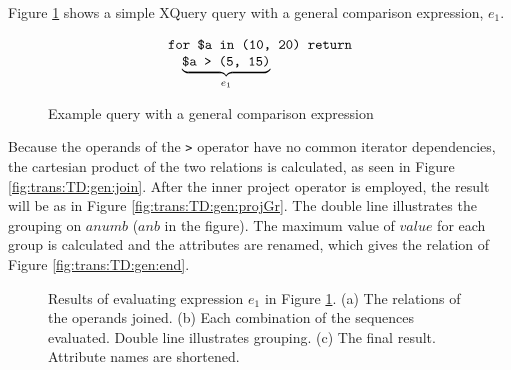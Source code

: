\begin{myExample}
Figure \ref{fig:trans:TD:genCompQu} shows a simple XQuery query with a general comparison expression, $e_1$.
\begin{figure}[h]
\centering
\begin{equation*}
\begin{array}{l}
\mbox{\texttt{for \$a in (10, 20) return}} \\ \quad
\underbrace{\mbox{\texttt{\$a > (5, 15)}}}_{e_1}
\end{array}
\end{equation*}
\caption{Example query with a general comparison expression \label{fig:trans:TD:genCompQu}}
\end{figure}
 
Because the operands of the \texttt{>} operator have no common iterator dependencies, the cartesian product of the
two relations is calculated, as seen in Figure \ref{fig:trans:TD:gen:join}.
After the inner \textsf{project} operator is employed, the result will be as in Figure \ref{fig:trans:TD:gen:projGr}. The double line illustrates
the grouping on $anumb$ ($anb$ in the figure). The maximum value of $value$ for each group is calculated and the
attributes are renamed, which gives the relation of Figure \ref{fig:trans:TD:gen:end}.

\begin{figure}[h]
\centering
{}
\qquad
{}
\qquad
{}
\caption[Results of evaluating $e_1$ in Figure \ref{fig:trans:TD:genCompQu}]{Results of evaluating expression $e_1$
in Figure \ref{fig:trans:TD:genCompQu}. (a) The relations of the operands joined. (b) Each combination of the
sequences evaluated. Double line illustrates grouping. (c) The final result. Attribute names are shortened.
\label{fig:trans:TD:genCompRes}}
\end{figure}
 
\end{myExample}
